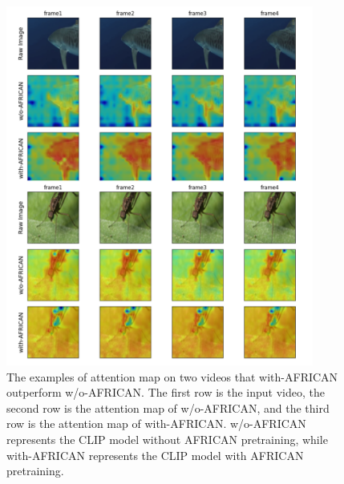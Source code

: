 \begin{figure}[ht]
    \centering
    \includegraphics[width=0.9\textwidth]{assets/charts/4_5_AttentionMaps_1}
    \caption[Attention Map 1 (Good examples)]{The examples of attention map on two videos that with-AFRICAN outperform w/o-AFRICAN. The first row is the input video, the second row is the attention map of w/o-AFRICAN, and the third row is the attention map of with-AFRICAN. w/o-AFRICAN represents the CLIP model without AFRICAN pretraining, while with-AFRICAN represents the CLIP model with AFRICAN pretraining.}
    \label{fig:attnmap1}
\end{figure}


